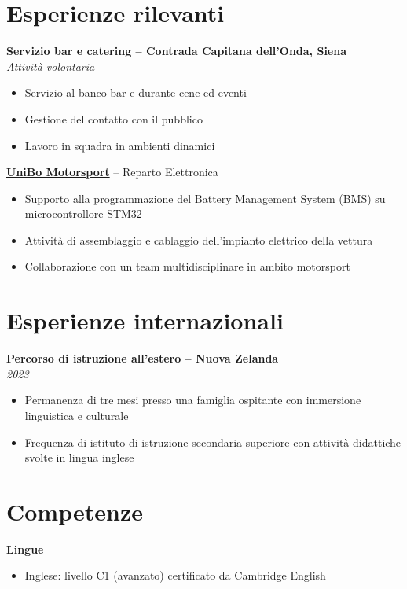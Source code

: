 \documentclass[a4paper,11pt]{article}
\begin{document}
\section*{Esperienze rilevanti}
\textbf{Servizio bar e catering – Contrada Capitana dell'Onda, Siena} \\
\textit{Attività volontaria}
\begin{itemize}[noitemsep]
    \item Servizio al banco bar e durante cene ed eventi
    \item Gestione del contatto con il pubblico
    \item Lavoro in squadra in ambienti dinamici
\end{itemize}

\textbf{\href{https://www.motorsport.unibo.it}{UniBo Motorsport}} -- {Reparto Elettronica}

\begin{itemize}[noitemsep]
    \item Supporto alla programmazione del Battery Management System (BMS) su microcontrollore STM32
    \item Attività di assemblaggio e cablaggio dell'impianto elettrico della vettura
    \item Collaborazione con un team multidisciplinare in ambito motorsport
\end{itemize}

\section*{Esperienze internazionali}
\textbf{Percorso di istruzione all'estero – Nuova Zelanda} \\
\textit{2023}
\begin{itemize}[noitemsep]
    \item Permanenza di tre mesi presso una famiglia ospitante con immersione linguistica e culturale
    \item Frequenza di istituto di istruzione secondaria superiore con attività didattiche svolte in lingua inglese
\end{itemize}

\section*{Competenze}
\textbf{Lingue}
\begin{itemize}[noitemsep]
    \item Inglese: livello C1 (avanzato) certificato da Cambridge English
\end{itemize}
\end{document}
